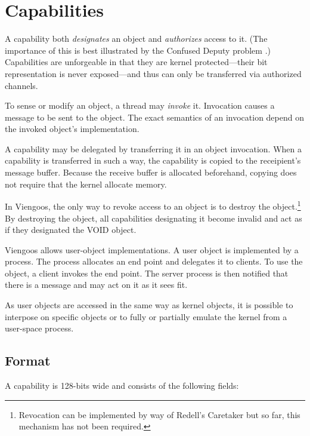 \section{Capabilities}

A capability both \emph{designates} an object and \emph{authorizes}
access to it.  (The importance of this is best illustrated by the
Confused Deputy problem \cite{hardy88confused-deputy}.)  Capabilities
are unforgeable in that they are kernel protected---their bit
representation is never exposed---and thus can only be transferred via
authorized channels.

To sense or modify an object, a thread may \emph{invoke} it.
Invocation causes a message to be sent to the object.  The exact
semantics of an invocation depend on the invoked object's
implementation.

A capability may be delegated by transferring it in an object
invocation.  When a capability is transferred in such a way, the
capability is copied to the receipient's message buffer.  Because the
receive buffer is allocated beforehand, copying does not require that
the kernel allocate memory.

In Viengoos, the only way to revoke access to an object is to destroy
the object.\footnote{Revocation can be implemented by way of Redell's
  Caretaker but so far, this mechanism has not been required.}  By
destroying the object, all capabilities designating it become invalid
and act as if they designated the VOID object.

Viengoos allows user-object implementations.  A user object is
implemented by a process.  The process allocates an end point and
delegates it to clients.  To use the object, a client invokes the end
point.  The server process is then notified that there is a message
and may act on it as it sees fit.

As user objects are accessed in the same way as kernel objects, it is
possible to interpose on specific objects or to fully or partially
emulate the kernel from a user-space process.

\subsection{Format}

A capability is 128-bits wide and consists of the following fields:


